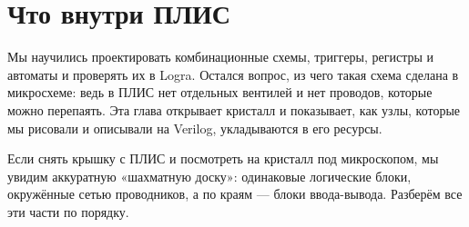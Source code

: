 \chapter{Что внутри ПЛИС}
\label{ch:inside}

Мы научились проектировать комбинационные схемы, триггеры, регистры и автоматы
и проверять их в Logra. Остался вопрос, из чего такая схема сделана в
микросхеме: ведь в ПЛИС нет отдельных вентилей и нет проводов, которые можно
перепаять. Эта глава открывает кристалл и показывает, как узлы, которые мы
рисовали и описывали на Verilog, укладываются в его ресурсы.

Если снять крышку с ПЛИС и посмотреть на кристалл под микроскопом, мы
увидим аккуратную «шахматную доску»: одинаковые логические блоки, окружённые
сетью проводников, а по краям --- блоки ввода-вывода. Разберём все эти
части по порядку.

